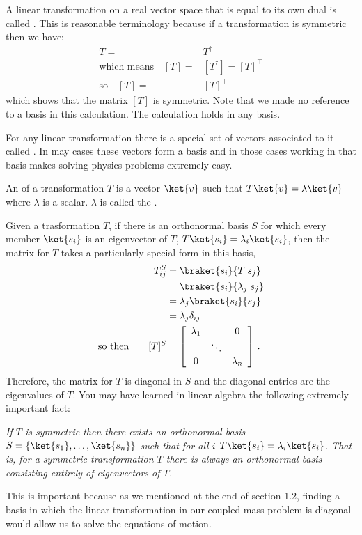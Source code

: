 A linear transformation on a real vector space that is equal to its own dual is called .
This is reasonable terminology because if a transformation is symmetric then we have:
\begin{align*}
  T =& T^{\dag} \\
  \textrm{which means} \quad
  [T] =& [T^{\dag}] = [T]^{\top} \\
  \textrm{so} \quad
  [T] =& [T]^{\top}
\end{align*}
which shows that the matrix $[T]$ is symmetric.
Note that we made no reference to a basis in this calculation.
The calculation holds in any basis.


For any linear transformation there is a special set of vectors associated to it called .
In may cases these vectors form a basis and in those cases working in that basis makes solving physics problems extremely easy.

\begin{definition}
  An  of a transformation $T$ is a vector $\ket{v}$ such that \mbox{$T\ket{v} = \lambda \ket{v}$} where $\lambda$ is a scalar.  $\lambda$ is called the .
\end{definition}

Given a trasformation $T$, if there is an orthonormal basis $S$ for which every member $\ket{s_i}$ is an eigenvector of $T$, \mbox{$T\ket{s_i}=\lambda_i\ket{s_i}$}, then the matrix for $T$ takes a particularly special form in this basis,
\begin{align*}
  T^{S}_{ij} &= \braket{s_i}{T|s_j}\\
  &= \braket{s_i}{\lambda _j|s_j}\\
  &= \lambda _j \braket{s_i}{s_j}\\
  &= \lambda _j \delta _{ij}\\
\textrm{so then} \qquad
  [T]^S &= \left[ \begin{array}{ccc} \lambda_1 & & 0 \\ & \ddots & \\ 0 & & \lambda_n \end{array} \right]
  \, .
\end{align*}
Therefore, the matrix for $T$ is diagonal in $S$ and the diagonal entries are the eigenvalues of $T$.
You may have learned in linear algebra the following extremely important fact:
\begin{center} \emph{If $T$ is symmetric then there exists an orthonormal basis $S = \{\ket{s_1}, \ldots, \ket{s_n} \}$ such that for all $i$ $T\ket{s_i} = \lambda_i\ket{s_i}$.  That is, for a symmetric transformation $T$ there is always an orthonormal basis consisting entirely of eigenvectors of $T$.} \end{center}
This is important because as we mentioned at the end of section 1.2, finding a basis in which the linear transformation in our coupled mass problem is diagonal would allow us to solve the equations of motion.

